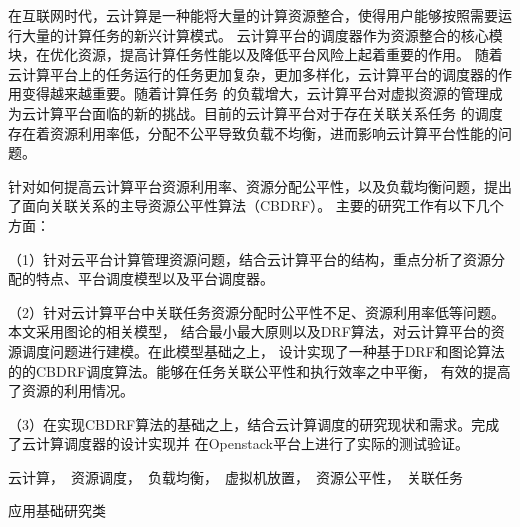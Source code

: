 
\begin{cabstract}
	
	在互联网时代，云计算是一种能将大量的计算资源整合，使得用户能够按照需要运行大量的计算任务的新兴计算模式。
	云计算平台的调度器作为资源整合的核心模块，在优化资源，提高计算任务性能以及降低平台风险上起着重要的作用。
	随着云计算平台上的任务运行的任务更加复杂，更加多样化，云计算平台的调度器的作用变得越来越重要。随着计算任务
	的负载增大，云计算平台对虚拟资源的管理成为云计算平台面临的新的挑战。目前的云计算平台对于存在关联关系任务
	的调度存在着资源利用率低，分配不公平导致负载不均衡，进而影响云计算平台性能的问题。
	
	针对如何提高云计算平台资源利用率、资源分配公平性，以及负载均衡问题，提出了面向关联关系的主导资源公平性算法（CBDRF）。
	主要的研究工作有以下几个方面：
	
	（1）针对云平台计算管理资源问题，结合云计算平台的结构，重点分析了资源分配的特点、平台调度模型以及平台调度器。

	（2）针对云计算平台中关联任务资源分配时公平性不足、资源利用率低等问题。本文采用图论的相关模型，
结合最小最大原则以及DRF算法，对云计算平台的资源调度问题进行建模。在此模型基础之上，
设计实现了一种基于DRF和图论算法的的CBDRF调度算法。能够在任务关联公平性和执行效率之中平衡，
有效的提高了资源的利用情况。

	（3）在实现CBDRF算法的基础之上，结合云计算调度的研究现状和需求。完成了云计算调度器的设计实现并
在Openstack平台上进行了实际的测试验证。

\end{cabstract}
\begin{ckeywords}
云计算，~资源调度，~负载均衡，~虚拟机放置，~资源公平性，~关联任务~~
\end{ckeywords}
\begin{cthesistype}
应用基础研究类
\end{cthesistype}




